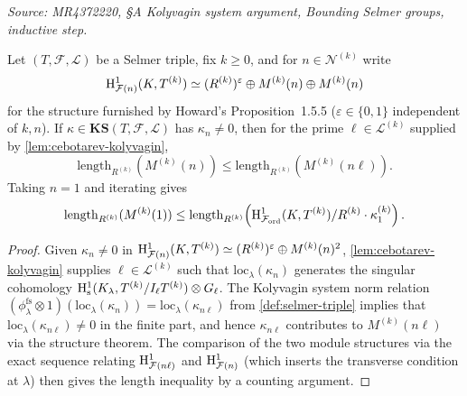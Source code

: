 \begin{lemma}
  \label{lem:kolyvagin-inductive-step}
  \textit{Source: MR4372220, §A Kolyvagin system argument, Bounding Selmer groups, inductive step.}

  Let \((T, \mathcal{F}, \mathcal{L})\) be a Selmer triple, fix \(k \geq 0\), and for \(n \in \mathcal{N}^{(k)}\) write
  \[
    \mathrm{H}^1_{\mathcal{F}(n)}(K, T^{(k)}) \simeq (R^{(k)})^{\varepsilon} \oplus M^{(k)}(n) \oplus M^{(k)}(n)
  \]
  for the structure furnished by Howard's Proposition~1.5.5 (\(\varepsilon \in \{0,1\}\) independent of \(k,n\)). If \(\kappa \in \mathbf{KS}(T, \mathcal{F}, \mathcal{L})\) has \(\kappa_n \neq 0\), then for the prime \(\ell \in \mathcal{L}^{(k)}\) supplied by \cref{lem:cebotarev-kolyvagin},
  \[
    \mathrm{length}_{R^{(k)}}(M^{(k)}(n)) \leq \mathrm{length}_{R^{(k)}}(M^{(k)}(n\ell)).
  \]
  Taking \(n = 1\) and iterating gives
  \[
    \mathrm{length}_{R^{(k)}}(M^{(k)}(1)) \leq \mathrm{length}_{R^{(k)}}\!\left(\mathrm{H}^1_{\mathcal{F}_{\mathrm{ord}}}(K, T^{(k)}) / R^{(k)} \cdot \kappa_1^{(k)}\right).
  \]
\end{lemma}

\begin{proof}
  Given \(\kappa_n \neq 0\) in \(\mathrm{H}^1_{\mathcal{F}(n)}(K, T^{(k)}) \simeq (R^{(k)})^{\varepsilon} \oplus M^{(k)}(n)^2\), \cref{lem:cebotarev-kolyvagin} supplies \(\ell \in \mathcal{L}^{(k)}\) such that \(\mathrm{loc}_\lambda(\kappa_n)\) generates the singular cohomology \(\mathrm{H}^1_{\mathrm{s}}(K_\lambda, T^{(k)}/I_\ell T^{(k)}) \otimes G_\ell\). The Kolyvagin system norm relation \((\phi_\lambda^{\mathrm{fs}} \otimes 1)(\mathrm{loc}_\lambda(\kappa_n)) = \mathrm{loc}_\lambda(\kappa_{n\ell})\) from \cref{def:selmer-triple} implies that \(\mathrm{loc}_\lambda(\kappa_{n\ell}) \neq 0\) in the finite part, and hence \(\kappa_{n\ell}\) contributes to \(M^{(k)}(n\ell)\) via the structure theorem. The comparison of the two module structures via the exact sequence relating \(\mathrm{H}^1_{\mathcal{F}(n\ell)}\) and \(\mathrm{H}^1_{\mathcal{F}(n)}\) (which inserts the transverse condition at \(\lambda\)) then gives the length inequality by a counting argument.
\end{proof}

